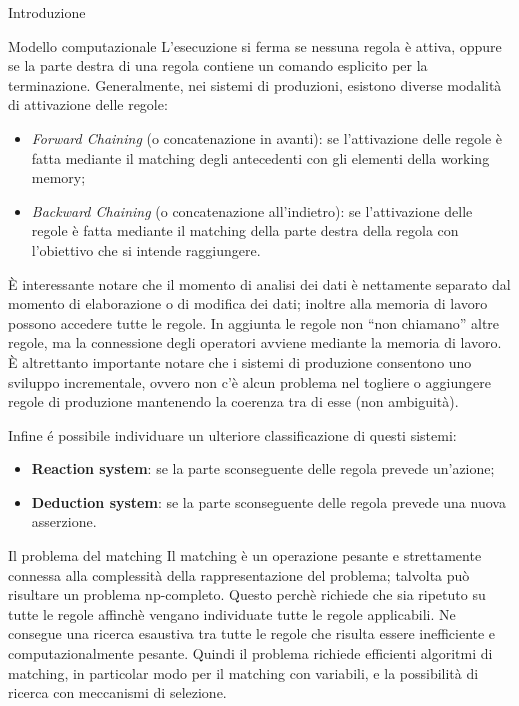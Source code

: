 \begin{chapter}{Introduzione}
\begin{section}{Modello computazionale}
L'esecuzione si ferma se nessuna regola \`e attiva, oppure se la parte destra di una regola
contiene un comando esplicito per la terminazione. Generalmente, nei sistemi di produzioni,
esistono diverse modalit\`a di attivazione delle regole:
\begin{itemize}
    \item \textit{Forward Chaining} (o concatenazione in avanti): se l'attivazione delle regole
    \`e fatta mediante il matching degli antecedenti con gli elementi della working memory;
    \item \textit{Backward Chaining} (o concatenazione all'indietro): se l'attivazione delle
    regole \`e fatta mediante il matching della parte destra della regola con l'obiettivo che si
    intende raggiungere.
\end{itemize}
\`E interessante notare che il momento di analisi dei dati \`e nettamente separato dal
momento di elaborazione o di modifica dei dati; inoltre alla memoria di lavoro possono
accedere tutte le regole. In aggiunta le regole non ``non chiamano'' altre regole, ma
la connessione degli operatori avviene mediante la memoria di lavoro. \`E altrettanto
importante notare che i sistemi di produzione consentono uno sviluppo incrementale,
ovvero non c'\`e alcun problema nel togliere o aggiungere regole di produzione mantenendo
la coerenza tra di esse (non ambiguit\`a).

Infine \'e possibile individuare un ulteriore classificazione di questi sistemi:
\begin{itemize}
    \item \textbf{Reaction system}: se la parte sconseguente delle regola prevede un'azione;
    \item \textbf{Deduction system}: se la parte sconseguente delle regola prevede una nuova asserzione.
\end{itemize}

	\begin{subsection}{Il problema del matching} 
	Il matching \`e un operazione pesante e strettamente connessa alla complessit\`a della
    rappresentazione del problema; talvolta pu\`o risultare un problema np-completo.
    Questo perch\`e richiede che sia ripetuto su tutte le regole affinch\`e vengano individuate
    tutte le regole applicabili. Ne consegue una ricerca esaustiva tra tutte le regole che
    risulta essere inefficiente e computazionalmente pesante. Quindi il problema richiede
    efficienti algoritmi di matching, in particolar modo per il matching con variabili,
    e la possibilit\`a di ricerca con meccanismi di selezione.


\end{subsection}
\end{section}
\end{chapter}
